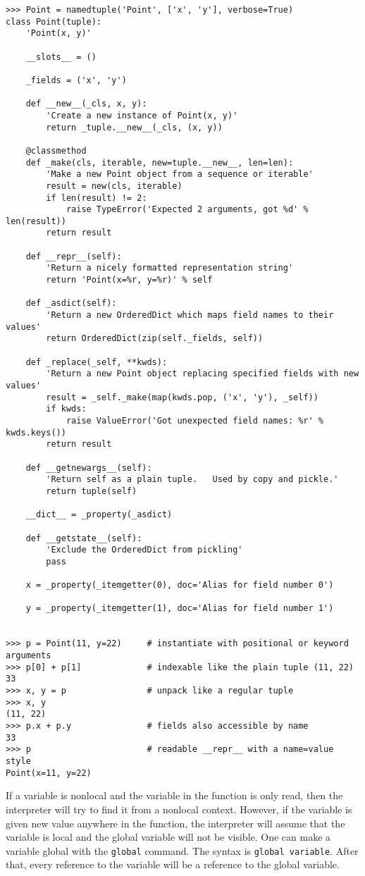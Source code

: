 \begin{verbatim}
>>> Point = namedtuple('Point', ['x', 'y'], verbose=True)
class Point(tuple):
    'Point(x, y)'

    __slots__ = ()

    _fields = ('x', 'y')

    def __new__(_cls, x, y):
        'Create a new instance of Point(x, y)'
        return _tuple.__new__(_cls, (x, y))

    @classmethod
    def _make(cls, iterable, new=tuple.__new__, len=len):
        'Make a new Point object from a sequence or iterable'
        result = new(cls, iterable)
        if len(result) != 2:
            raise TypeError('Expected 2 arguments, got %d' % len(result))
        return result

    def __repr__(self):
        'Return a nicely formatted representation string'
        return 'Point(x=%r, y=%r)' % self

    def _asdict(self):
        'Return a new OrderedDict which maps field names to their values'
        return OrderedDict(zip(self._fields, self))

    def _replace(_self, **kwds):
        'Return a new Point object replacing specified fields with new values'
        result = _self._make(map(kwds.pop, ('x', 'y'), _self))
        if kwds:
            raise ValueError('Got unexpected field names: %r' % kwds.keys())
        return result

    def __getnewargs__(self):
        'Return self as a plain tuple.   Used by copy and pickle.'
        return tuple(self)

    __dict__ = _property(_asdict)

    def __getstate__(self):
        'Exclude the OrderedDict from pickling'
        pass

    x = _property(_itemgetter(0), doc='Alias for field number 0')

    y = _property(_itemgetter(1), doc='Alias for field number 1')


>>> p = Point(11, y=22)     # instantiate with positional or keyword arguments
>>> p[0] + p[1]             # indexable like the plain tuple (11, 22)
33
>>> x, y = p                # unpack like a regular tuple
>>> x, y
(11, 22)
>>> p.x + p.y               # fields also accessible by name
33
>>> p                       # readable __repr__ with a name=value style
Point(x=11, y=22)
\end{verbatim}

If a variable is nonlocal and the variable in the function is only read, then
the interpreter will try to find it from a nonlocal context. However, if the
variable is given new value anywhere in the function, the interpreter will
assume that the variable is local and the global variable will not be visible.
One can make a variable global with the \texttt{global} command. The syntax is
\texttt{global variable}. After that, every reference to the variable will be a
reference to the global variable.

